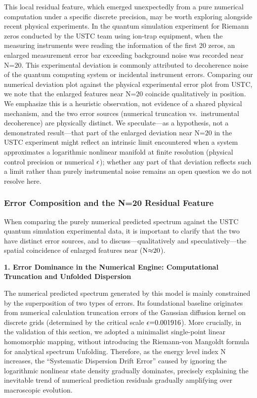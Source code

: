 \documentclass[fleqn,10pt]{wlscirep}
\begin{document}
This local residual feature, which emerged unexpectedly from a pure
numerical computation under a specific discrete precision, may be worth
exploring alongside recent physical experiments.
In the quantum simulation experiment for Riemann zeros conducted by the
USTC team using ion-trap equipment, when the measuring instruments were
reading the information of the first 20 zeros, an enlarged measurement
error bar exceeding background noise was recorded near
\(\text{N}\text{=20}\). This experimental deviation is commonly
attributed to decoherence noise of the quantum computing system or
incidental instrument errors. Comparing our
numerical deviation plot against the physical experimental error
plot from USTC, we note that the enlarged features near
\(\text{N}\text{=20}\) coincide qualitatively in
position. We emphasize this is a heuristic observation, not evidence of
a shared physical mechanism, and the two error sources (numerical
truncation vs.~instrumental decoherence) are physically distinct. We
speculate---as a hypothesis, not a demonstrated result---that part of
the enlarged deviation near \(\text{N}\text{=20}\) in the USTC experiment
might reflect an intrinsic limit encountered when a system approximates a
logarithmic nonlinear manifold at finite resolution (physical control
precision or numerical \(\text{\ensuremath{\epsilon}}\)); whether any part of that
deviation reflects such a limit rather than purely instrumental noise
remains an open question we do not resolve here.

\subsubsection*{Error Composition and the N=20 Residual Feature}

When comparing the purely numerical predicted spectrum against the
USTC quantum simulation experimental data, it is important to clarify
that the two have distinct error sources, and to discuss---qualitatively
and speculatively---the spatial coincidence of enlarged features near
(\(\text{N}\text{\ensuremath{\approx}20}\)).

\textbf{1. Error Dominance in the Numerical Engine: Computational
Truncation and Unfolded Dispersion}

The numerical predicted spectrum generated by this model is mainly
constrained by the superposition of two types of errors. Its
foundational baseline originates from numerical calculation truncation
errors of the Gaussian diffusion kernel on discrete grids (determined by
the critical scale \(\text{\ensuremath{\epsilon}=0.001916}\)). More crucially, in the
validation of this section, we adopted a minimalist single-point linear
homomorphic mapping, without introducing the Riemann-von Mangoldt
formula for analytical spectrum Unfolding. Therefore, as the energy
level index \(\text{N}\) increases, the ``Systematic Dispersion Drift
Error'' caused by ignoring the logarithmic nonlinear state density
gradually dominates, precisely explaining the inevitable trend of
numerical prediction residuals gradually amplifying over macroscopic
evolution.
\end{document}
